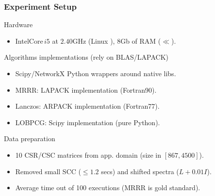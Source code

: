  \begin{frame}
  \frametitle{Experiment Setup}
  \begin{block}{Hardware}
    \begin{itemize}
    \item Intel\textregistered Core\texttrademark $\,i5$ at $2.40$GHz
      (Linux ), $8$Gb of RAM ($\ll$).
    \end{itemize}
  \end{block}
  \begin{block}{Algorithms implementations (rely on BLAS/LAPACK)}
    \begin{itemize}
    \item Scipy/NetworkX Python wrappers around native libs.
    \item MRRR: LAPACK implementation (Fortran90).
    \item Lanczos: ARPACK implementation (Fortran77).
    \item LOBPCG: Scipy implementation (pure Python).
    \end{itemize}
  \end{block}
  \begin{block}{Data preparation}
    \begin{itemize}
    \item 10 CSR/CSC matrices from app. domain (size in $[867,4500]$).
    \item Removed small SCC ($\le 1.2$ secs) and shifted spectra ($L + 0.01I$).
    \item Average time out of 100 executions (MRRR is gold standard).
    \end{itemize}
  \end{block}    
\end{frame}
